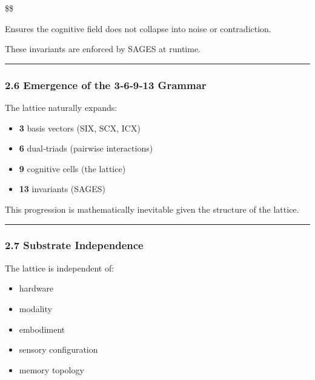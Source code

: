 \$\$

Ensures the cognitive field does not collapse into noise or contradiction.

These invariants are enforced by SAGES at runtime.

\begin{center}\rule{0.5\linewidth}{0.5pt}\end{center}

\subsubsection{2.6 Emergence of the 3‑6‑9‑13 Grammar}\label{emergence-of-the-36913-grammar}

The lattice naturally expands:

\begin{itemize}
\tightlist
\item
  \textbf{3} basis vectors (SIX, SCX, ICX)\\
\item
  \textbf{6} dual‑triads (pairwise interactions)\\
\item
  \textbf{9} cognitive cells (the lattice)\\
\item
  \textbf{13} invariants (SAGES)
\end{itemize}

This progression is mathematically inevitable given the structure of the lattice.

\begin{center}\rule{0.5\linewidth}{0.5pt}\end{center}

\subsubsection{2.7 Substrate Independence}\label{substrate-independence}

The lattice is independent of:

\begin{itemize}
\tightlist
\item
  hardware\\
\item
  modality\\
\item
  embodiment\\
\item
  sensory configuration\\
\item
  memory topology
\end{itemize}

